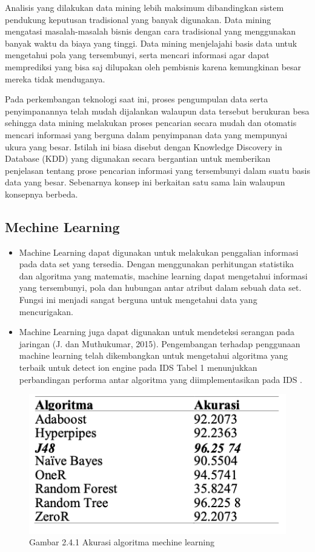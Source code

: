 \documentclass[conference]{IEEEtran}
\begin{document}
Analisis yang dilakukan data mining lebih maksimum dibandingkan sistem pendukung keputusan tradisional yang banyak digunakan. Data mining mengatasi masalah-masalah bisnis dengan cara tradisional yang menggunakan banyak waktu da biaya yang tinggi. Data mining menjelajahi basis data untuk mengetahui pola yang tersembunyi, serta mencari informasi agar dapat memprediksi yang bisa saj dilupakan oleh pembisnis karena kemungkinan besar mereka tidak menduganya.

Pada perkembangan teknologi saat ini, proses pengumpulan data serta penyimpanannya telah mudah dijalankan walaupun data tersebut berukuran besa sehingga data mining melakukan proses pencarian secara mudah dan otomatis mencari informasi yang berguna dalam penyimpanan data yang mempunyai ukura yang besar. Istilah ini biasa disebut dengan Knowledge Discovery in Database (KDD) yang digunakan secara bergantian untuk memberikan penjelasan tentang prose pencarian informasi yang tersembunyi dalam suatu basis data yang besar. Sebenarnya konsep ini berkaitan satu sama lain walaupun konsepnya berbeda.

\subsection{Mechine Learning}
\begin{itemize}
    \item Machine Learning dapat digunakan untuk melakukan penggalian informasi pada data set yang tersedia. Dengan menggunakan perhitungan statistika dan algoritma yang matematis, machine learning dapat mengetahui informasi yang tersembunyi, pola dan hubungan antar atribut dalam sebuah data set. Fungsi ini menjadi sangat berguna untuk mengetahui data yang mencurigakan.
    \item Machine Learning juga dapat digunakan untuk mendeteksi serangan pada jaringan (J. dan Muthukumar, 2015). Pengembangan terhadap penggunaan machine learning telah dikembangkan untuk mengetahui algoritma yang terbaik untuk detect ion engine pada IDS Tabel 1 menunjukkan perbandingan performa antar algoritma yang diimplementasikan pada IDS .
\end{itemize}

\begin{figure}
\centering
\includegraphics[width=.4\textwidth]{picture/Gambar 2.4.1.PNG}
\caption{Gambar 2.4.1 Akurasi algoritma mechine learning}
\end{figure}
\end{document}
